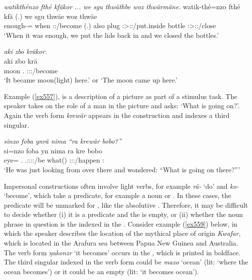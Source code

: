 \begin{exe}
	\ex \emph{watikthénzo fthé kfäkor ... we sgu thwäthbe woz thwärmäne.}
	\gll watik-thé=nzo fthé kfä (.) we sgu thwäe woz thwäe\\
	enough-\Adlzr=\Only{} when \Stsg:\Sbj:\Iter/become (.) also plug \Fpl:\Sbj>\Stpl:\Obj:\Iter/put.inside bottle \Fpl:\Sbj>\Stpl:\Obj:\Iter/close\\
	\trans `When it was enough, we put the lids back in and we closed the bottles.'\\
	\label{ex737}
\end{exe}
\begin{exe}
	\ex \emph{aki zbo kräkor.}\\
	\gll aki zbo krä\\
	moon \Prox.\All{} \Stsg:\Sbj:\Irr:\Pfv/become\\
	\trans `It became moon(light) here.' or `The moon came up here.'\\
	\label{ex738}
\end{exe}

Example (\ref{ex557}), is a description of a picture as part of a stimulus task. The speaker takes on the role of a man in the picture and asks: `What is going on?'. Again the verb form \emph{krewär} appears in the  construction and indexes a third singular.

\begin{exe}
	\ex \emph{sinzo foba ynrä nima ``ra krewär bobo?''}\\
	\gll si=nzo foba yn nima ra kre bobo\\
	eye=\Only{} \Dist.\Abl{} \Tsg.\Masc:\Sbj:\Nonpast:\Ipfv:\Venit/be \Quot{} what(\Abs) \Stsg:\Sbj:\Irr:\Pfv/happen \Med:\All{}\\
	\trans `He was just looking from over there and wondered: ``What is going on there?'''
	\label{ex557}
\end{exe}

Impersonal constructions often involve light verbs, for example \emph{rä-} `do' and \emph{ko-} `become', which take a  predicate, for example a noun or . In these cases, the  predicate will be unmarked for , like the absolutive . Therefore, it may be difficult to decide whether (i) it is a  predicate and the  is empty, or (ii) whether the noun phrase in question is the  indexed in the . Consider example (\ref{ex559}) below, in which the speaker describes the location of the mythical place of origin \emph{Kwafar}, which is located in the Arafura sea between Papua New Guinea and Australia. The verb form \emph{ŋakonzr} `it becomes' occurs in the , which is printed in boldface. The third singular indexed in the verb form could be \emph{mazo} `ocean' (lit: `where the ocean becomes') or it could be an empty  (lit: `it becomes ocean').

